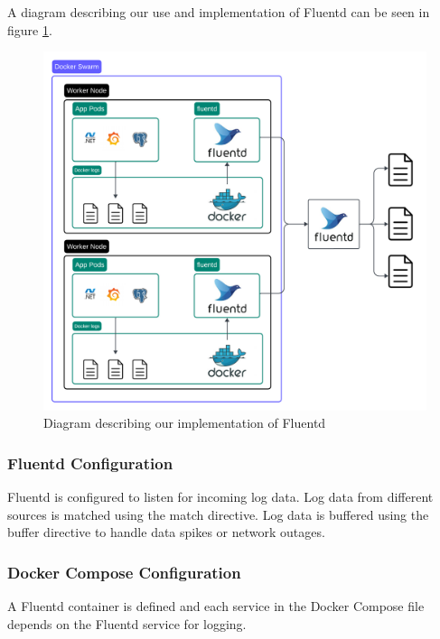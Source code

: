 A diagram describing our use and implementation of Fluentd can be seen in figure \ref{fig:logging2}.
\begin{figure}[H]
	\centering
	\includegraphics[width=1\textwidth]{Logging2.png}
	\caption{Diagram describing our implementation of Fluentd}
	\label{fig:logging2}
\end{figure}

\subsubsection*{Fluentd Configuration}

Fluentd is configured to listen for incoming log data. %
Log data from different sources is matched using the match directive. %
Log data is buffered using the buffer directive to handle data spikes or network outages.

\subsubsection*{Docker Compose Configuration}

A Fluentd container is defined %
and each service in the Docker Compose file depends on the Fluentd service for logging.

